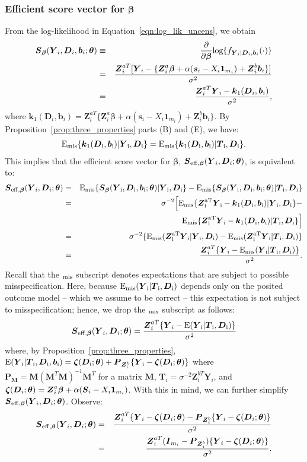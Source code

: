 \documentclass[12pt]{article}
\def\log{\hbox{log}}
\def\bse{\begin{eqnarray*}}
\def\ese{\end{eqnarray*}}
\def\bse{\begin{eqnarray*}}
\def\ese{\end{eqnarray*}}
\def\bS{{\mathbf S}}
\newcommand{\bzeta}{\mbox{\boldmath $\zeta$}}
\def\bbeta{{\boldsymbol{\beta}}}
\def\btheta{{\boldsymbol{\theta}}}
\def\bone{{\boldsymbol{1}}}
\def\bb{{\boldsymbol b}}
\def\bk{{\boldsymbol k}}
\def\bs{{\boldsymbol s}}
\def\bD{{\boldsymbol D}}
\def\bI{{\boldsymbol I}}
\def\bM{{\boldsymbol M}}
\def\bP{{\boldsymbol P}}
\def\bS{{\boldsymbol S}}
\def\bT{{\boldsymbol T}}
\def\bY{{\boldsymbol Y}}
\def\bZ{{\boldsymbol Z}}
\def\tilD{\bD}
\def\E{\rm E}
\begin{document}
\subsubsection{Efficient score vector for $\bbeta$}
\label{sec:beta_uncens}
From the log-likelihood in Equation~\eqref{eqn:log_lik_uncens}, we obtain
\bse
\bS_{\bbeta}(\bY_i,\tilD_i,\bb_i;\btheta)&\equiv&\frac{\partial}{\partial\bbeta}\log\{f_{\bY_i|\tilD_i,\bb_i}(\cdot)\}\\
&=&\frac{\bZ_i^{aT}[\bY_i-\{\bZ_i^a\bbeta  + \alpha(\bs_i - X_i\bone_{m_i}) + \bZ_i^b\bb_i\}]}{\sigma^2}\\
&=&\frac{\bZ_i^{aT}\bY_i-\bk_1(\tilD_i,\bb_i)}{\sigma^2},
\ese
where $\bk_1(\tilD_i,\bb_i)=\bZ_i^{aT}\{\bZ_i^a\bbeta  + \alpha(\bs_i - X_i\bone_{m_i}) + \bZ_i^b\bb_i\}$. By Proposition~\ref{prop:three_properties} parts (B) and (E), we have:
\bse
\E_{\rm{mis}}\{\bk_1(\tilD_i,\bb_i)|\bY_i,\tilD_i\}
=\E_{\rm{mis}}\{\bk_1(\tilD_i,\bb_i)|\bT_i,\tilD_i\}.
\ese
This implies that the efficient score vector for $\bbeta$, $\bS_{\rm{eff},\bbeta}(\bY_i,\tilD_i;\btheta)$, is equivalent to:
\bse
\bS_{\rm{eff},\bbeta}(\bY_i,\tilD_i;\btheta)
&=&\E_{\rm{mis}}\{\bS_{\bbeta}(\bY_i,\tilD_i,\bb_i;\btheta)|\bY_i,\tilD_i\}-\E_{\rm{mis}}\{\bS_{\bbeta}(\bY_i,\tilD_i,\bb_i;\btheta)|\bT_i,\tilD_i\}\\
%
&=&\sigma^{-2}\Big[\E_{\rm{mis}}\{\bZ_i^{aT}\bY_i-\bk_1(\tilD_i,\bb_i)|\bY_i,\tilD_i\}-\\
&&\E_{\rm{mis}}\{\bZ_i^{aT}\bY_i-\bk_1(\tilD_i,\bb_i)|\bT_i,\tilD_i\}\Big]\\
%
&=&\sigma^{-2}\{\E_{\rm{mis}}(\bZ_i^{aT}\bY_i|\bY_i,\tilD_i)-\E_{\rm{mis}}(\bZ_i^{aT}\bY_i|\bT_i,\tilD_i)\}\\
&=&\frac{\bZ_i^{aT}\{\bY_i-\E_{\rm{mis}}(\bY_i|\bT_i,\tilD_i)\}}{\sigma^2}.
\ese
Recall that the $_{\rm{mis}}$ subscript denotes expectations that are subject to possible misspecification. Here, because $\E_{\rm{mis}}(\bY_i|\bT_i,\tilD_i)$  depends only on the posited outcome model -- which we assume to be correct -- this expectation is not subject to misspecification; hence, we drop the $_{\rm{mis}}$ subscript as follows:
\bse
\bS_{\rm{eff},\bbeta}(\bY_i,\tilD_i;\btheta)
=\frac{\bZ_i^{aT}\{\bY_i-\E(\bY_i|\bT_i,\tilD_i)\}}{\sigma^2}
\ese
where, by Proposition~\ref{prop:three_properties}, $\rm{E}(\bY_i|\bT_i,\tilD_i,\bb_i)=\bzeta(\tilD_i;\btheta)+\bP_{\bZ_i^b}\{\bY_i-\bzeta(\tilD_i;\btheta)\}$ where $\bP_{\bM} = \bM(\bM^T\bM)^{-1}\bM^T$ for a matrix $\bM$, $\bT_i = \sigma^{-2}\bZ_i^{bT}\bY_i$, and $\bzeta(\tilD_i;\btheta)=\bZ_i^a\bbeta  + \alpha(\bS_i - X_i\bone_{m_i})$. With this in mind, we can further simplify $\bS_{\rm{eff},\bbeta}(\bY_i,\tilD_i;\btheta)$.
Observe:
\bse
\bS_{\rm{eff},\bbeta}(\bY_i,\tilD_i;\btheta)&=&\frac{\bZ_i^{aT}\{\bY_i-\bzeta(\tilD_i;\btheta)-\bP_{\bZ_i^b}\{\bY_i-\bzeta(\tilD_i;\btheta)\}}{\sigma^2} \\
&=&\frac{\bZ_i^{aT}(\bI_{m_i} - \bP_{\bZ_i^b})\{\bY_i-\bzeta(\tilD_i;\btheta)\}}{\sigma^2}.
\ese
\end{document}
